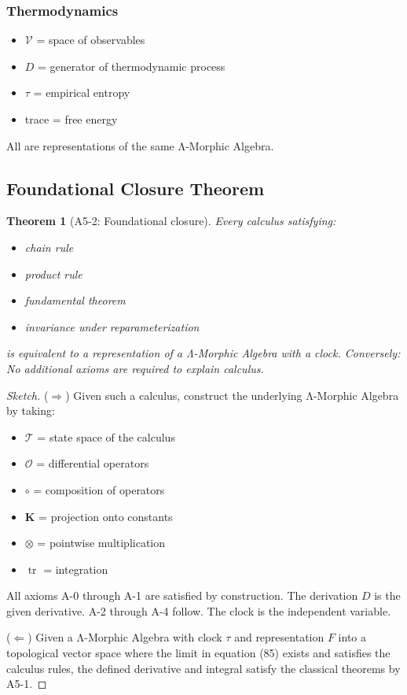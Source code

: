 \documentclass[12pt, oneside]{article}
\newtheorem{theorem}{Theorem}[section]
\DeclareMathOperator{\tr}{tr}
\newcommand{\K}{\mathbf{K}}
\newcommand{\T}{\mathcal{T}}
\newcommand{\Opr}{\mathcal{O}}
\begin{document}
\subsubsection{Thermodynamics}
\begin{itemize}
    \item $\mathcal{V}$ = space of observables
    \item $D$ = generator of thermodynamic process
    \item $\tau$ = empirical entropy
    \item trace = free energy
\end{itemize}

All are representations of the same Λ-Morphic Algebra.

\subsection{Foundational Closure Theorem}

\begin{theorem}[A5-2: Foundational closure]
Every calculus satisfying:
\begin{itemize}
    \item chain rule
    \item product rule
    \item fundamental theorem
    \item invariance under reparameterization
\end{itemize}
is equivalent to a representation of a Λ-Morphic Algebra with a clock. Conversely: No additional axioms are required to explain calculus.
\end{theorem}

\begin{proof}[Sketch]
($\Rightarrow$) Given such a calculus, construct the underlying Λ-Morphic Algebra by taking:
\begin{itemize}
    \item $\T$ = state space of the calculus
    \item $\Opr$ = differential operators
    \item $\circ$ = composition of operators
    \item $\K$ = projection onto constants
    \item $\otimes$ = pointwise multiplication
    \item $\tr$ = integration
\end{itemize}
All axioms A-0 through A-1 are satisfied by construction. The derivation $D$ is the given derivative. A-2 through A-4 follow. The clock is the independent variable.

($\Leftarrow$) Given a Λ-Morphic Algebra with clock $\tau$ and representation $F$ into a topological vector space where the limit in equation (85) exists and satisfies the calculus rules, the defined derivative and integral satisfy the classical theorems by A5-1.
\end{proof}
\end{document}
